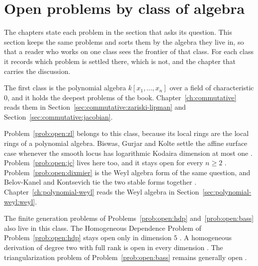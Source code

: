 \section{Open problems by class of algebra}\label{sec:basic-theory:open-problems-by-class}

The chapters state each problem in the section that asks its question. %
This section keeps the same problems and sorts them by the algebra they live
in, so that a reader who works on one class sees the frontier of that class.
For each class it records which problem is settled there, which is not, and the
chapter that carries the discussion.

The first class is the polynomial algebra $k[x_1,\dots,x_n]$ over a field of
characteristic $0$, and it holds the deepest problems of the book.
Chapter~\ref{ch:commutative} reads them in
Section~\ref{sec:commutative:zariski-lipman} and
Section~\ref{sec:commutative:jacobian}. %

Problem~\ref{prob:open:zl} belongs to this class, because its local rings are
the local rings of a polynomial algebra.
Biswas, Gurjar and Kolte settle the affine surface case whenever the smooth
locus has logarithmic Kodaira dimension at most one
\cite[Theorem~1.2, p.~270]{BiswasGurjarKolte2014}.
Problem~\ref{prob:open:jc} lives here too, and it stays open for every $n\ge2$
\cite[pp.~1--2]{BelovKanelKontsevich2007}.
Problem~\ref{prob:open:dixmier} is the Weyl algebra form of the same question,
and Belov-Kanel and Kontsevich tie the two stable forms together
\cite[Theorem~1, p.~3]{BelovKanelKontsevich2007}.
Chapter~\ref{ch:polynomial-weyl} reads the Weyl algebra in
Section~\ref{sec:polynomial-weyl:weyl}.

The finite generation problems of Problems~\ref{prob:open:hdp}
and~\ref{prob:open:bass} also live in this class.
The Homogeneous Dependence Problem of Problem~\ref{prob:open:hdp} stays open
only in dimension $5$ \cite[p.~108]{Freudenburg2017}.
A homogeneous derivation of degree two with full rank is open in every
dimension \cite[Remark~3.51, p.~112]{Freudenburg2017}.
The triangularization problem of Problem~\ref{prob:open:bass} remains generally
open \cite[p.~288]{Freudenburg2017}.

